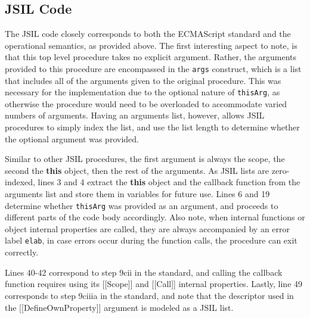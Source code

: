 \documentclass[a4paper,11pt,twoside]{report}
\def\jsinline{\lstinline[language=JavaScript, basicstyle=\small]}%\end{lstlisting}
\begin{document}
\subsection{JSIL Code}
The JSIL code closely corresponds to both the ECMAScript standard and the operational semantics, as provided above. The first interesting aspect to note, is that this top level procedure takes no explicit argument. Rather, the arguments provided to this procedure are encompassed in the \jsinline|args| construct, which is a list that includes all of the arguments given to the original procedure. This was necessary for the implementation due to the optional nature of \jsinline|thisArg|, as otherwise the procedure would need to be overloaded to accommodate varied numbers of arguments. Having an arguments list, however, allows JSIL procedures to simply index the list, and use the list length to determine whether the optional argument was provided.

Similar to other JSIL procedures, the first argument is always the scope, the second the \textbf{this} object, then the rest of the arguments. As JSIL lists are zero-indexed, lines 3 and 4 extract the \textbf{this} object and the callback function from the arguments list and store them in variables for future use. Lines 6 and 19 determine whether \jsinline|thisArg| was provided as an argument, and proceeds to different parts of the code body accordingly. Also note, when internal functions or object internal properties are called, they are always accompanied by an error label \jsinline|elab|, in case errors occur during the function calls, the procedure can exit correctly.

Lines 40-42 correspond to step 9cii in the standard, and calling the callback function requires using its [[Scope]] and [[Call]] internal properties. Lastly, line 49 corresponds to step 9ciiia in the standard, and note that the descriptor used in the [[DefineOwnProperty]] argument is modeled as a JSIL list.
\end{document}
